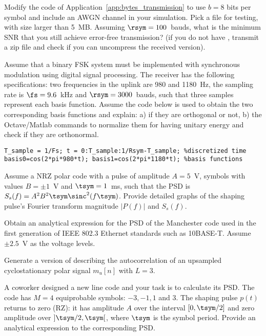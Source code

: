 \begin{exercises}
\item Modify the code of Application~\ref{app:bytes_transmission} to use $b=8$ bits per symbol and include an AWGN channel in your simulation. Pick a file for testing, with size larger than 5~MB. Assuming $\rsym=100$~bauds, what is the minimum SNR that you still achieve error-free transmission? (if you do not have , transmit a zip file and check if you can uncompress the received version).

\item Assume that a binary FSK system must be implemented with synchronous modulation using digital signal processing. The receiver has the following specifications: two frequencies in the uplink are 980 and 1180~Hz, the sampling rate is $\fs=9.6$~kHz and $\rsym=3000$~bauds, 
such that three samples represent each basis function. Assume the code below is used to obtain the two corresponding basis functions and explain: a) if they are orthogonal or not, b) the Octave/Matlab commands to normalize them for having unitary energy and check if they are orthonormal.
\begin{lstlisting}
T_sample = 1/Fs; t = 0:T_sample:1/Rsym-T_sample; %discretized time
basis0=cos(2*pi*980*t); basis1=cos(2*pi*1180*t); %basis functions
\end{lstlisting}


\item Assume a NRZ polar code with a pulse of amplitude $A=5$~V, symbols with values $B=\pm 1$~V and $\tsym=1$~ms, such that the PSD is $S_s(f) = A^2 B^2 \tsym \sinc^2(f \tsym)$. Provide detailed graphs of the shaping pulse's Fourier transform magnitude $|P(f)|$ and $S_s(f)$.

\item Obtain an analytical expression for the PSD of the Manchester code used in the first generation of IEEE 802.3 Ethernet standards such as 10BASE-T. Assume $\pm 2.5$~V as the voltage levels.

\item Generate a version of  describing the autocorrelation of an upsampled cyclostationary  polar signal $m_u[n]$ with $L=3$.

\item A coworker designed a new line code and your task is to calculate its PSD. The code has $M=4$ equiprobable symbols: $-3, -1, 1$ and 3. The shaping pulse $p(t)$ returns to zero (RZ): it has amplitude $A$ over the interval $[0, \tsym/2]$ and zero amplitude over $]\tsym/2, \tsym[$, where $\tsym$ is the symbol period. Provide an analytical expression to the corresponding PSD.

\end{exercises}
%
